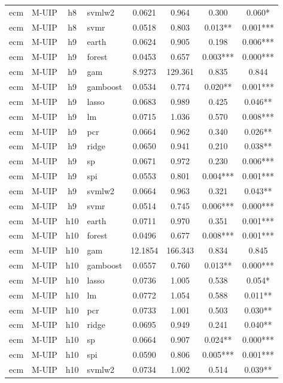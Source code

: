 \begin{ThreePartTable}
\begin{longtable}[t]{llclcccc}
ecm & M-UIP & h8 & svmlw2 & 0.0621 & 0.964 & 0.300 & 0.060*\\
ecm & M-UIP & h8 & svmr & 0.0518 & 0.803 & 0.013** & 0.001***\\
\addlinespace
ecm & M-UIP & h9 & earth & 0.0624 & 0.905 & 0.198 & 0.006***\\
ecm & M-UIP & h9 & forest & 0.0453 & 0.657 & 0.003*** & 0.000***\\
ecm & M-UIP & h9 & gam & 8.9273 & 129.361 & 0.835 & 0.844\\
ecm & M-UIP & h9 & gamboost & 0.0534 & 0.774 & 0.020** & 0.001***\\
ecm & M-UIP & h9 & lasso & 0.0683 & 0.989 & 0.425 & 0.046**\\
ecm & M-UIP & h9 & lm & 0.0715 & 1.036 & 0.570 & 0.008***\\
ecm & M-UIP & h9 & pcr & 0.0664 & 0.962 & 0.340 & 0.026**\\
ecm & M-UIP & h9 & ridge & 0.0650 & 0.941 & 0.210 & 0.038**\\
ecm & M-UIP & h9 & sp & 0.0671 & 0.972 & 0.230 & 0.006***\\
ecm & M-UIP & h9 & spi & 0.0553 & 0.801 & 0.004*** & 0.001***\\
ecm & M-UIP & h9 & svmlw2 & 0.0664 & 0.963 & 0.321 & 0.043**\\
ecm & M-UIP & h9 & svmr & 0.0514 & 0.745 & 0.006*** & 0.000***\\
\addlinespace
ecm & M-UIP & h10 & earth & 0.0711 & 0.970 & 0.351 & 0.001***\\
ecm & M-UIP & h10 & forest & 0.0496 & 0.677 & 0.008*** & 0.001***\\
ecm & M-UIP & h10 & gam & 12.1854 & 166.343 & 0.834 & 0.845\\
ecm & M-UIP & h10 & gamboost & 0.0557 & 0.760 & 0.013** & 0.000***\\
ecm & M-UIP & h10 & lasso & 0.0736 & 1.005 & 0.538 & 0.054*\\
ecm & M-UIP & h10 & lm & 0.0772 & 1.054 & 0.588 & 0.011**\\
ecm & M-UIP & h10 & pcr & 0.0733 & 1.001 & 0.503 & 0.030**\\
ecm & M-UIP & h10 & ridge & 0.0695 & 0.949 & 0.241 & 0.040**\\
ecm & M-UIP & h10 & sp & 0.0664 & 0.907 & 0.024** & 0.000***\\
ecm & M-UIP & h10 & spi & 0.0590 & 0.806 & 0.005*** & 0.001***\\
ecm & M-UIP & h10 & svmlw2 & 0.0734 & 1.002 & 0.514 & 0.039**\\

\end{longtable}
\end{ThreePartTable}
